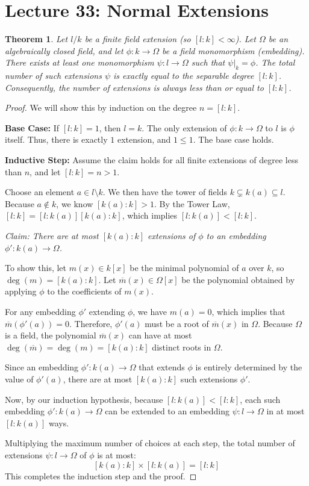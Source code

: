 \documentclass[a4paper,12pt]{article}
\newtheorem{thm}{Theorem}[section]
\begin{document}
\section{Lecture 33: Normal Extensions}
\begin{thm}
    Let $l/k$ be a finite field extension (so $[l:k] < \infty$). Let $\Omega$ be an algebraically closed field, and let $\phi: k \to \Omega$ be a field monomorphism (embedding). There exists at least one monomorphism $\psi: l \to \Omega$ such that $\psi|_k = \phi$. The total number of such extensions $\psi$ is exactly equal to the separable degree $[l:k]$. Consequently, the number of extensions is always less than or equal to $[l:k]$.
\end{thm}

\begin{proof}
    We will show this by induction on the degree $n = [l:k]$.

    \textbf{Base Case:} If $[l:k] = 1$, then $l = k$. The only extension of $\phi: k \to \Omega$ to $l$ is $\phi$ itself. Thus, there is exactly $1$ extension, and $1 \leq 1$. The base case holds.

    \textbf{Inductive Step:} Assume the claim holds for all finite extensions of degree less than $n$, and let $[l:k] = n > 1$.

    Choose an element $a \in l \setminus k$. We then have the tower of fields $k \subsetneq k(a) \subseteq l$. Because $a \notin k$, we know $[k(a):k] > 1$. By the Tower Law, $[l:k] = [l:k(a)][k(a):k]$, which implies $[l:k(a)] < [l:k]$.

    \textit{Claim: There are at most $[k(a):k]$ extensions of $\phi$ to an embedding $\phi': k(a) \to \Omega$.}

    To show this, let $m(x) \in k[x]$ be the minimal polynomial of $a$ over $k$, so $\deg(m) = [k(a):k]$. Let $\overline{m}(x) \in \Omega[x]$ be the polynomial obtained by applying $\phi$ to the coefficients of $m(x)$.

    For any embedding $\phi'$ extending $\phi$, we have $m(a) = 0$, which implies that $\overline{m}(\phi'(a)) = 0$. Therefore, $\phi'(a)$ must be a root of $\overline{m}(x)$ in $\Omega$. Because $\Omega$ is a field, the polynomial $\overline{m}(x)$ can have at most $\deg(\overline{m}) = \deg(m) = [k(a):k]$ distinct roots in $\Omega$.

    Since an embedding $\phi': k(a) \to \Omega$ that extends $\phi$ is entirely determined by the value of $\phi'(a)$, there are at most $[k(a):k]$ such extensions $\phi'$.

    Now, by our induction hypothesis, because $[l:k(a)] < [l:k]$, each such embedding $\phi': k(a) \to \Omega$ can be extended to an embedding $\psi: l \to \Omega$ in at most $[l:k(a)]$ ways.

    Multiplying the maximum number of choices at each step, the total number of extensions $\psi: l \to \Omega$ of $\phi$ is at most:
    $$[k(a):k] \times [l:k(a)] = [l:k]$$
    This completes the induction step and the proof.
\end{proof}
\end{document}
